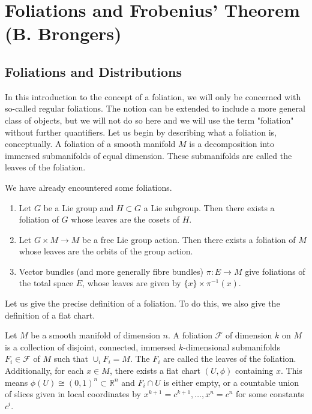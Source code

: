\chapter{Foliations and Frobenius' Theorem (B. Brongers)}

\section{Foliations and Distributions}

In this introduction to the concept of a foliation, we will only be concerned with so-called regular foliations. The notion can be extended to include a more general class of objects, but we will not do so here and we will use the term "foliation" without further quantifiers. Let us begin by describing what a foliation is, conceptually. A foliation of a smooth manifold $M$ is a decomposition into immersed submanifolds of equal dimension. These submanifolds are called the leaves of the foliation.
\begin{example}
  We have already encountered some foliations.
  \begin{enumerate}
    \item Let $G$ be a Lie group and $H\subset G$ a Lie subgroup. Then there exists a foliation of $G$ whose leaves are the cosets of $H$.
    \item Let $G\times M\to M$ be a free Lie group action. Then there exists a foliation of $M$ whose leaves are the orbits of the group action.
    \item Vector bundles (and more generally fibre bundles) $\pi:E\to M$ give foliations of the total space $E$, whose leaves are given by $\{x\}\times \pi^{-1}(x)$.
  \end{enumerate}
\end{example}
Let us give the precise definition of a foliation. To do this, we also give the definition of a flat chart.
\begin{definition}
  Let $M$ be a smooth manifold of dimension $n$. A foliation $\mathcal{F}$ of dimension $k$ on $M$ is a collection of disjoint, connected, immersed $k$-dimensional submanifolds $F_i\in\mathcal{F}$ of $M$ such that $\cup_iF_i=M$. The $F_i$ are called the leaves of the foliation. Additionally, for each $x\in M$, there exists a flat chart $(U,\phi)$ containing $x$. This means $\phi(U)\cong (0,1)^n\subset\mathbb{R}^n$ and $F_i\cap U$ is either empty, or a countable union of slices given in local coordinates by $x^{k+1}=c^{k+1},\dots,x^n=c^n$ for some constants $c^i$.
\end{definition}
